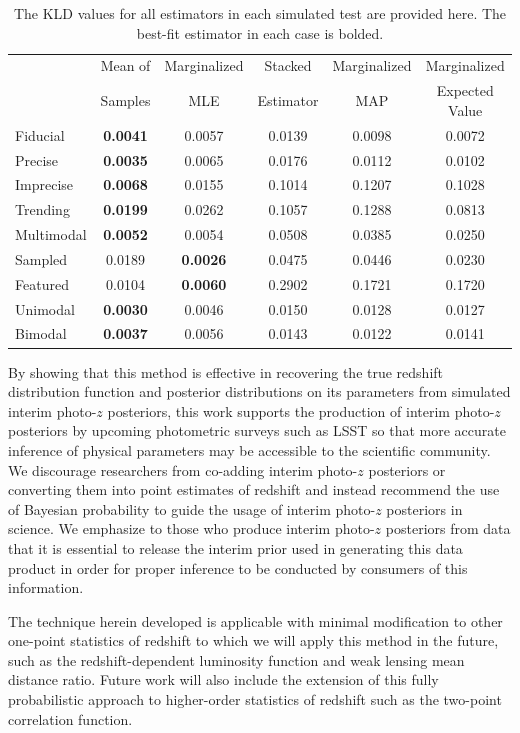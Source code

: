 \begin{table}
	\begin{tabular}{lccccc}
		& Mean of & Marginalized & Stacked & Marginalized & Marginalized\\
		& Samples & MLE & Estimator & MAP & Expected Value\\
		Fiducial &\textbf{0.0041}&0.0057&0.0139&0.0098&0.0072\\
		Precise &\textbf{0.0035}&0.0065&0.0176&0.0112&0.0102\\
		Imprecise &\textbf{0.0068}&0.0155&0.1014&0.1207&0.1028\\
		Trending &\textbf{0.0199}&0.0262&0.1057&0.1288&0.0813\\
		Multimodal &\textbf{0.0052}&0.0054&0.0508&0.0385&0.0250\\
		Sampled &0.0189&\textbf{0.0026}&0.0475&0.0446&0.0230\\
		Featured &0.0104&\textbf{0.0060}&0.2902&0.1721&0.1720\\
		Unimodal &\textbf{0.0030}&0.0046&0.0150&0.0128&0.0127\\
		Bimodal &\textbf{0.0037}&0.0056&0.0143&0.0122&0.0141
	\end{tabular}
	\caption{The KLD values for all estimators in each simulated test are provided here.
		The best-fit estimator in each case is bolded.}
\end{table}

By showing that this method is effective in recovering the true redshift distribution function and posterior distributions on its parameters from simulated interim photo-$z$ posteriors, this work supports the production of interim photo-$z$ posteriors by upcoming photometric surveys such as LSST so that more accurate inference of physical parameters may be accessible to the scientific community.  
We discourage researchers from co-adding interim photo-$z$ posteriors or converting them into point estimates of redshift and instead recommend the use of Bayesian probability to guide the usage of interim photo-$z$ posteriors in science.  
We emphasize to those who produce interim photo-$z$ posteriors from data that it is essential to release the interim prior used in generating this data product in order for proper inference to be conducted by consumers of this information.

The technique herein developed is applicable with minimal modification to other one-point statistics of redshift to which we will apply this method in the future, such as the redshift-dependent luminosity function and weak lensing mean distance ratio.  
Future work will also include the extension of this fully probabilistic approach to higher-order statistics of redshift such as the two-point correlation function.

